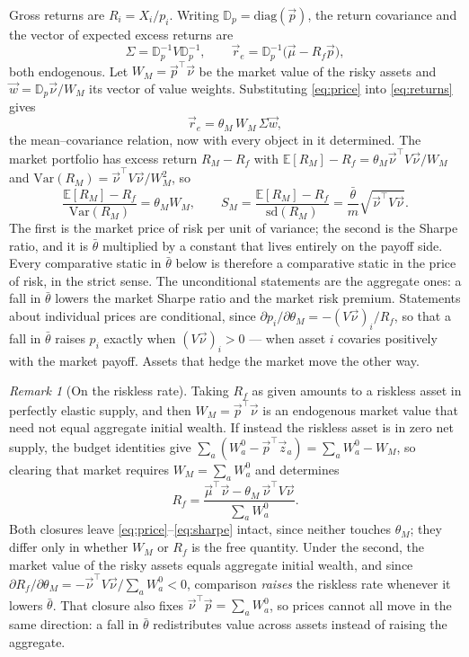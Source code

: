 \documentclass[12pt]{article}
\theoremstyle{definition}
\theoremstyle{remark}
\newtheorem{remark}{Remark}
\newcommand{\E}{\mathbb{E}}
\newcommand{\bth}{\bar\theta}
\newcommand{\D}{\mathbb{D}}
\begin{document}
Gross returns are $R_i=X_i/p_i$. Writing $\D_p=\mathrm{diag}(\vec p)$, the
return covariance and the vector of expected excess returns are
%
\begin{equation}
\Sigma=\D_p^{-1}V\D_p^{-1},
\qquad
\vec r_e=\D_p^{-1}\big(\vec\mu-R_f\vec p\big) ,
\label{eq:returns}
\end{equation}
%
both endogenous. Let $W_M=\vec p^{\top}\vec\nu$ be the market value of the risky
assets and $\vec w=\D_p\vec\nu/W_M$ its vector of value weights. Substituting
\eqref{eq:price} into \eqref{eq:returns} gives
%
\begin{equation}
\vec r_e=\theta_M\,W_M\,\Sigma\vec w ,
\label{eq:clear}
\end{equation}
%
the mean--covariance relation, now with every object in it determined. The
market portfolio has excess return $R_M-R_f$ with
$\E[R_M]-R_f=\theta_M\vec\nu^{\top}V\vec\nu/W_M$ and
$\mathrm{Var}(R_M)=\vec\nu^{\top}V\vec\nu/W_M^{2}$, so
%
\begin{equation}
\frac{\E[R_M]-R_f}{\mathrm{Var}(R_M)}=\theta_MW_M ,
\qquad
S_M=\frac{\E[R_M]-R_f}{\mathrm{sd}(R_M)}
=\frac{\bth}{m}\sqrt{\vec\nu^{\top}V\vec\nu} .
\label{eq:sharpe}
\end{equation}
%
The first is the market price of risk per unit of variance; the second is the
Sharpe ratio, and it is $\bth$ multiplied by a constant that lives entirely on
the payoff side. Every comparative static in $\bth$ below is therefore a
comparative static in the price of risk, in the strict sense. The
unconditional statements are the aggregate ones: a fall in $\bth$ lowers the
market Sharpe ratio and the market risk premium. Statements about individual
prices are conditional, since
$\partial p_i/\partial\theta_M=-(V\vec\nu)_i/R_f$, so that a fall in $\bth$
raises $p_i$ exactly when $(V\vec\nu)_i>0$ --- when asset $i$ covaries
positively with the market payoff. Assets that hedge the market move the other
way.

\begin{remark}[On the riskless rate]
\label{rem:rf}
Taking $R_f$ as given amounts to a riskless asset in perfectly elastic supply,
and then $W_M=\vec p^{\top}\vec\nu$ is an endogenous market value that need not
equal aggregate initial wealth. If instead the riskless asset is in zero net
supply, the budget identities give $\sum_a(W_a^0-\vec p^{\top}\vec z_a)
=\sum_aW_a^0-W_M$, so clearing that market requires
$W_M=\sum_aW_a^0$ and determines
%
\begin{equation*}
R_f=\frac{\vec\mu^{\top}\vec\nu-\theta_M\,\vec\nu^{\top}V\vec\nu}
{\sum_aW_a^0} .
\end{equation*}
%
Both closures leave \eqref{eq:price}--\eqref{eq:sharpe} intact, since neither
touches $\theta_M$; they differ only in whether $W_M$ or $R_f$ is the free
quantity. Under the second, the market value of the risky assets equals
aggregate initial wealth, and since
$\partial R_f/\partial\theta_M=-\vec\nu^{\top}V\vec\nu/\sum_aW_a^0<0$,
comparison \emph{raises} the riskless rate whenever it lowers $\bth$. That
closure also fixes $\vec\nu^{\top}\vec p=\sum_aW_a^0$, so prices cannot all move
in the same direction: a fall in $\bth$ redistributes value across assets
instead of raising the aggregate.
\end{remark}
\end{document}
